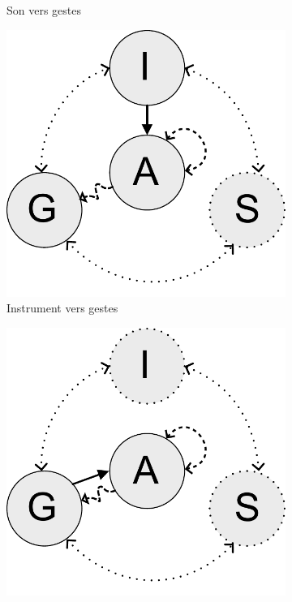 \begin{figure}[!htbp]
{\begin{subfigure}[b]{.33\textwidth}
			\caption{Son vers gestes}
		\end{subfigure}%
		\hspace{.02\linewidth}
		\begin{subfigure}[b]{.33\textwidth}
			\centering
			\includegraphics[width=0.9\linewidth]{gfx/03_gesture/gesture-inference-b.pdf}
			\caption{Instrument vers gestes}
		\end{subfigure}%
		\hspace{.02\linewidth}
		\begin{subfigure}[b]{.33\textwidth}
			\centering
			\includegraphics[width=0.9\linewidth]{gfx/03_gesture/gesture-inference-c.pdf}

\end{subfigure}}
\end{figure}
